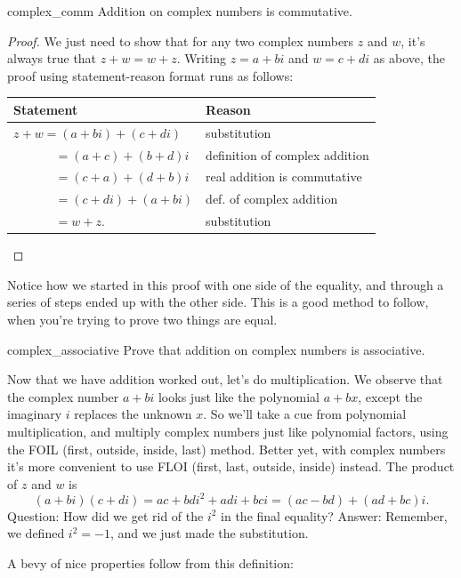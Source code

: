 \begin{prop}{complex_comm}
Addition on complex numbers is commutative.
\end{prop}
\begin{proof}
We just need to show that for any two complex numbers $z$ and $w$, it's always true that $z + w = w + z$.  Writing $z = a + bi$ and $w = c + di$ as above, the proof using statement-reason format runs as follows:

\begin{tabular}{l| l}
Statement& Reason\\
\hline
$z + w = (a + bi) + (c + di)$ &substitution\\
~~~~~~ $= (a + c) + (b + d)i$ & definition of complex addition\\
~~~~~~ $= (c + a) + (d + b)i$ & real addition is commutative\\
~~~~~~ $= (c + di) + (a + bi)$ & def. of complex addition\\
~~~~~~ $= w + z$. & substitution\\
\end{tabular}

\end{proof}

Notice how we started in this proof with one side of the equality, and through a series of steps ended up with the other side. This is a good method to follow, when you're trying to prove two things are equal.

\begin{exercise}{complex_associative}
Prove that addition on complex numbers is associative.
\end{exercise}

Now that we have addition worked out, let's do multiplication. We observe that the complex number $a + bi$ looks just  like the polynomial $a + bx$, except the imaginary $i$ replaces the unknown $x$. So we'll take a cue from polynomial multiplication, and  multiply complex numbers just like
polynomial factors, using the FOIL (first, outside, inside, last) method. Better yet, with complex numbers it's more convenient to use FLOI (first, last, outside, inside) instead.  The product of $z$ and
$w$ is \[
(a+bi)(c+di)=ac+bdi^{2}+adi+bci=(ac-bd)+(ad+bc)i.\]
Question: How did we get rid of the $i^2$ in the final equality?  Answer: Remember, we defined $i^2 = -1$, and we just made the substitution.

A bevy of nice properties follow from this definition:


